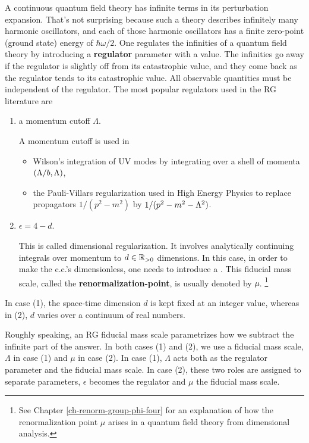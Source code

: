 A continuous
quantum field
theory has
infinite
terms in its perturbation
expansion. That's
not surprising because
such a theory
describes infinitely many
harmonic
oscillators, and each of
those harmonic oscillators  has a
finite zero-point (ground state) energy of $\hbar\omega/2$.
One regulates the infinities
of a quantum field theory
by introducing a \textbf{regulator}
parameter with a  value.
The
infinities go away if
the regulator is slightly
off from its catastrophic
value, and they come back as
 the regulator
tends to its catastrophic
value.  All
observable
quantities must
be independent of the regulator.
The most popular
regulators used in the RG literature
are
\begin{enumerate}
\item
a momentum cutoff $\Lambda$. 

A  momentum cutoff is used in 
\begin{itemize}
\item Wilson's  integration of UV modes by integrating over 
a shell of momenta $(\Lambda/b, \Lambda)$, 
\item 
the Pauli-Villars regularization
used in High Energy Physics
to replace propagators $1/(p^2-m^2)$
by $1/(p^2-m^2-\Lambda^2)$.
\end{itemize}
\item 
$\epsilon = 4 -d$. 

This is called
dimensional regularization.
It involves analytically continuing
integrals over momentum
to $d\in{ \mathbb{R}}_{>0}$ dimensions.
In this case, in order to make
the c.c.'s dimensionless,
one needs to introduce a
. 
This fiducial mass scale,
called
the \textbf{renormalization-point},
is usually denoted by $\mu$.
\footnote{See Chapter \ref{ch-renorm-group-phi-four}
for an explanation
of how the renormalization point
$\mu$ arises in a quantum field theory
from dimensional analysis.}
\end{enumerate}

In case (1), the space-time
dimension $d$ is kept
fixed at an integer value, whereas
in (2), $d$ varies
over a continuum of real
numbers.


Roughly speaking,
an RG fiducial mass scale
parametrizes
how we
subtract the infinite
part of the answer.
In both cases (1) and (2), we use a fiducial mass scale,
$\Lambda$ in case (1) and $\mu$ in case (2).
In case (1),
$\Lambda$ acts both as
the regulator parameter and
the fiducial mass scale.
In case (2), these
two roles are assigned to
separate parameters, $\epsilon$
becomes the regulator and
$\mu$ the fiducial mass scale.




